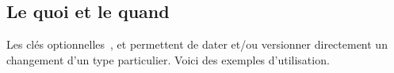 \documentclass{../main/main}
\begin{document}
\subsection{Le quoi et le quand}

Les clés optionnelles \,,  et  permettent de dater et/ou versionner directement un changement d'un type particulier. Voici des exemples d'utilisation.

\end{document}
